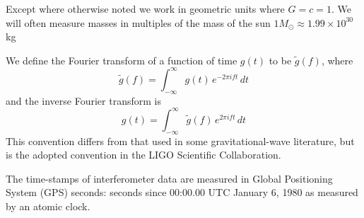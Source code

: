 \documentclass[12pt,notitlepage]{report}
\newcommand{\msun}{M_\odot}
\begin{document}
\noindent Except where otherwise noted we work in geometric units where
$G=c=1$.  We will often measure masses in multiples of the mass of the
sun $1 \msun \approx 1.99 \times 10^{30}$ kg 

\vspace{0.5cm}

\noindent We define the Fourier transform of a function of time $g(t)$ to be
$\tilde{g}(f)$, where
%
\begin{equation*}
\tilde{g}(f)=\int_{-\infty}^\infty g(t)\, e^{- 2 \pi i f t}\, dt
\end{equation*}
%
and the inverse Fourier transform is
%
\begin{equation*}
g(t)=\int_{-\infty}^\infty \tilde{g}(f)\, e^{2 \pi i f t}\, dt
\end{equation*}
%
This convention differs from that used in some gravitational-wave
literature, but is the adopted convention in the LIGO Scientific
Collaboration.

\vspace{0.5cm}

\noindent The time-stamps of interferometer data are measured in
Global Positioning System (GPS) seconds: seconds since 00:00.00 UTC
January 6, 1980 as measured by an atomic clock.


\afterpreface

\label{ch:introduction}


\label{ch:theory}


\label{ch:ligo_detectors}


\label{ch:search}


\label{ch:comparison}


\label{ch:ninja1}


\label{ch:ninja2}


\label{ch:ninja2_results}


\label{ch:segdb}


\label{ch:detchar}


\label{ch:conclusions}


\appendix
{}
\label{ch:pn_waveforms}


\clearpage


\end{document}
